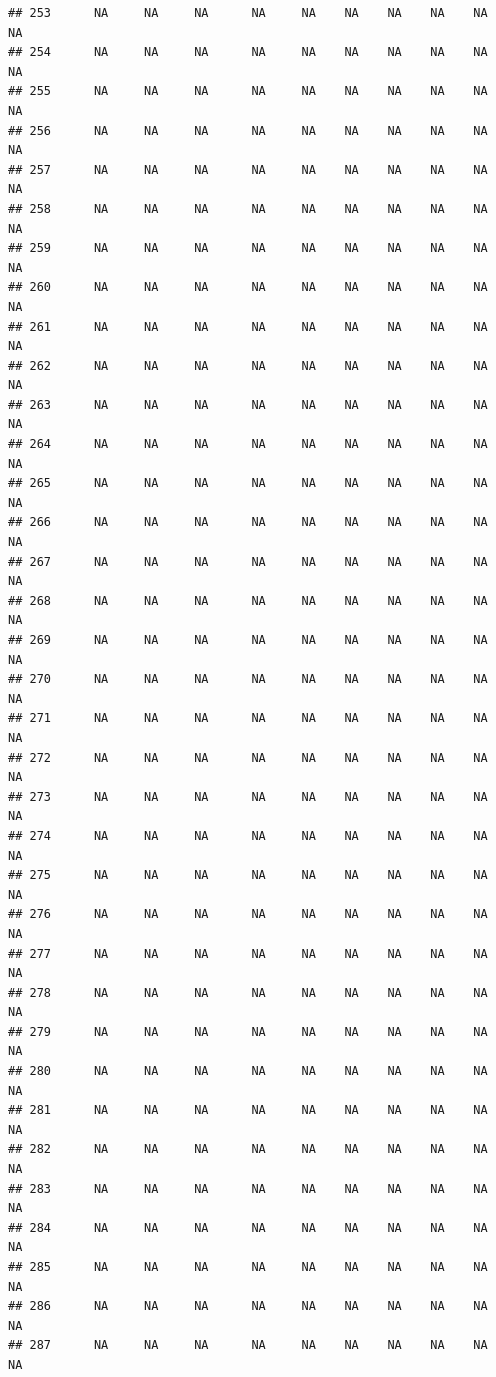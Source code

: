 \documentclass{article}\usepackage{graphicx, color}
\makeatletter
\newenvironment{kframe}{%
 \def\at@end@of@kframe{}%
 \ifinner\ifhmode%
  \def\at@end@of@kframe{\end{minipage}}%
  \begin{minipage}{\columnwidth}%
 \fi\fi%
 \def\FrameCommand##1{\hskip\@totalleftmargin \hskip-\fboxsep
 \colorbox{shadecolor}{##1}\hskip-\fboxsep
     \hskip-\linewidth \hskip-\@totalleftmargin \hskip\columnwidth}%
 \MakeFramed {\advance\hsize-\width
   \@totalleftmargin\z@ \linewidth\hsize
   \@setminipage}}%
 {\par\unskip\endMakeFramed%
 \at@end@of@kframe}
\newenvironment{knitrout}{}{} %
\makeatother
\begin{document}
\begin{knitrout}
\begin{kframe}
\begin{verbatim}
## 253      NA     NA     NA      NA     NA    NA    NA    NA    NA     NA
## 254      NA     NA     NA      NA     NA    NA    NA    NA    NA     NA
## 255      NA     NA     NA      NA     NA    NA    NA    NA    NA     NA
## 256      NA     NA     NA      NA     NA    NA    NA    NA    NA     NA
## 257      NA     NA     NA      NA     NA    NA    NA    NA    NA     NA
## 258      NA     NA     NA      NA     NA    NA    NA    NA    NA     NA
## 259      NA     NA     NA      NA     NA    NA    NA    NA    NA     NA
## 260      NA     NA     NA      NA     NA    NA    NA    NA    NA     NA
## 261      NA     NA     NA      NA     NA    NA    NA    NA    NA     NA
## 262      NA     NA     NA      NA     NA    NA    NA    NA    NA     NA
## 263      NA     NA     NA      NA     NA    NA    NA    NA    NA     NA
## 264      NA     NA     NA      NA     NA    NA    NA    NA    NA     NA
## 265      NA     NA     NA      NA     NA    NA    NA    NA    NA     NA
## 266      NA     NA     NA      NA     NA    NA    NA    NA    NA     NA
## 267      NA     NA     NA      NA     NA    NA    NA    NA    NA     NA
## 268      NA     NA     NA      NA     NA    NA    NA    NA    NA     NA
## 269      NA     NA     NA      NA     NA    NA    NA    NA    NA     NA
## 270      NA     NA     NA      NA     NA    NA    NA    NA    NA     NA
## 271      NA     NA     NA      NA     NA    NA    NA    NA    NA     NA
## 272      NA     NA     NA      NA     NA    NA    NA    NA    NA     NA
## 273      NA     NA     NA      NA     NA    NA    NA    NA    NA     NA
## 274      NA     NA     NA      NA     NA    NA    NA    NA    NA     NA
## 275      NA     NA     NA      NA     NA    NA    NA    NA    NA     NA
## 276      NA     NA     NA      NA     NA    NA    NA    NA    NA     NA
## 277      NA     NA     NA      NA     NA    NA    NA    NA    NA     NA
## 278      NA     NA     NA      NA     NA    NA    NA    NA    NA     NA
## 279      NA     NA     NA      NA     NA    NA    NA    NA    NA     NA
## 280      NA     NA     NA      NA     NA    NA    NA    NA    NA     NA
## 281      NA     NA     NA      NA     NA    NA    NA    NA    NA     NA
## 282      NA     NA     NA      NA     NA    NA    NA    NA    NA     NA
## 283      NA     NA     NA      NA     NA    NA    NA    NA    NA     NA
## 284      NA     NA     NA      NA     NA    NA    NA    NA    NA     NA
## 285      NA     NA     NA      NA     NA    NA    NA    NA    NA     NA
## 286      NA     NA     NA      NA     NA    NA    NA    NA    NA     NA
## 287      NA     NA     NA      NA     NA    NA    NA    NA    NA     NA

\end{verbatim}
\end{kframe}
\end{knitrout}
\end{document}
